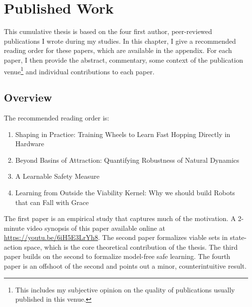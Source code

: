 
\chapter{Published Work} \label{chap:pubs}

This cumulative thesis is based on the four first author, peer-reviewed publications I wrote during my studies. In this chapter, I give a recommended reading order for these papers, which are available in the appendix. For each paper, I then provide the abstract, commentary, some context of the publication venue\footnote{This includes my subjective opinion on the quality of publications usually published in this venue.} and individual contributions to each paper.

\section{Overview}
The recommended reading order is:
\begin{enumerate}
    \item Shaping in Practice: Training Wheels to Learn Fast Hopping Directly in Hardware
    \item Beyond Basins of Attraction: Quantifying Robustness of Natural Dynamics
    \item A Learnable Safety Measure
    \item Learning from Outside the Viability Kernel: Why we should build Robots that can Fall with Grace
\end{enumerate}
The first paper is an empirical study that captures much of the motivation. A 2-minute video synopsis of this paper available online at \url{https://youtu.be/6iH5E3LrYh8}. The second paper formalizes viable sets in state-action space, which is the core theoretical contribution of the thesis. The third paper builds on the second to formalize model-free safe learning. The fourth paper is an offshoot of the second and points out a minor, counterintuitive result.

